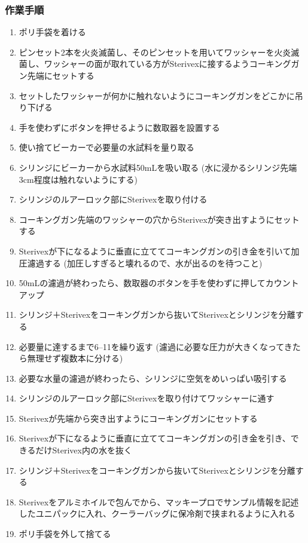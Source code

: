 \documentclass[titlepage,10pt,a4paper]{jsbook}
\begin{document}
\subsubsection{作業手順}
\begin{enumerate}
\item ポリ手袋を着ける
\item ピンセット2本を火炎滅菌し、そのピンセットを用いてワッシャーを火炎滅菌し、ワッシャーの面が取れている方がSterivexに接するようコーキングガン先端にセットする
\item セットしたワッシャーが何かに触れないようにコーキングガンをどこかに吊り下げる
\item 手を使わずにボタンを押せるように数取器を設置する
\item 使い捨てビーカーで必要量の水試料を量り取る
\item シリンジにビーカーから水試料50mLを吸い取る (水に浸かるシリンジ先端3cm程度は触れないようにする)
\item シリンジのルアーロック部にSterivexを取り付ける
\item コーキングガン先端のワッシャーの穴からSterivexが突き出すようにセットする
\item Sterivexが下になるように垂直に立ててコーキングガンの引き金を引いて加圧濾過する (加圧しすぎると壊れるので、水が出るのを待つこと)
\item 50mLの濾過が終わったら、数取器のボタンを手を使わずに押してカウントアップ
\item シリンジ＋Sterivexをコーキングガンから抜いてSterivexとシリンジを分離する
\item 必要量に達するまで6--11を繰り返す (濾過に必要な圧力が大きくなってきたら無理せず複数本に分ける)
\item 必要な水量の濾過が終わったら、シリンジに空気をめいっぱい吸引する
\item シリンジのルアーロック部にSterivexを取り付けてワッシャーに通す
\item Sterivexが先端から突き出すようにコーキングガンにセットする
\item Sterivexが下になるように垂直に立ててコーキングガンの引き金を引き、できるだけSterivex内の水を抜く
\item シリンジ＋Sterivexをコーキングガンから抜いてSterivexとシリンジを分離する
\item Sterivexをアルミホイルで包んでから、マッキープロでサンプル情報を記述したユニパックに入れ、クーラーバッグに保冷剤で挟まれるように入れる
\item ポリ手袋を外して捨てる
\end{enumerate}
\end{document}
